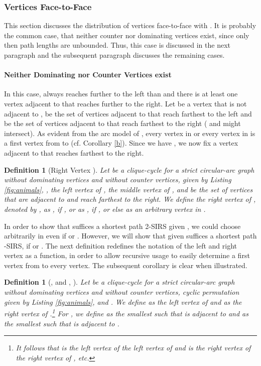 \documentclass[10pt]{article}
\newtheorem{definition}[theorem]{Definition}
\begin{document}
\subsubsection{Vertices Face-to-Face}\label{mvbislv}





This section discusses the distribution of vertices face-to-face with .
It is probably the common case, that neither counter nor dominating vertices exist,
since only then path lengths are unbounded.
Thus, this case is discussed in the next paragraph and the 
subsequent paragraph discusses the remaining cases.


\paragraph{Neither Dominating nor Counter Vertices exist}\label{beideLeer}
In this case,  always reaches further to the left than  and there is at least 
one vertex adjacent to  that reaches further to the right.
Let  be a vertex that is not adjacent to ,  be the set of vertices adjacent to  
that reach farthest to the left and  be the set of vertices adjacent to  that reach 
farthest to the right ( and  might intersect).
As evident from the arc model of , every vertex in  or every vertex in  
is a first vertex from  to  (cf. Corollary \ref{b}).
Since we have , we now fix a vertex adjacent to  that reaches farthest to the right.

\begin{definition}[Right Vertex ]\label{de_r_v}
Let  be a clique-cycle for a strict cir\-cu\-lar-arc graph  without 
dominating vertices and without counter vertices,  given by Listing \ref{fig:animals}, 
,  the left vertex of ,  the middle vertex of , and  be the 
set of vertices that are adjacent to  and reach farthest to the right.
We define the \emph{right vertex of }, denoted by ,  as , if , or 
as , if , or else as an arbitrary vertex in .
\end{definition}
In order to show that  suffices a shortest path 2-SIRS given , we could choose  arbitrarily in  even if  or .
However, we will show that  given  suffices a 
shortest path -SIRS, if  or .
The next definition redefines the notation of the left and right vertex as a 
function, in order to allow 
recursive usage to easily determine a first vertex from  to every vertex.
The subsequent corollary is clear when illustrated.

\begin{definition}[,   and , ]\label{lvi}
Let  be a clique-cycle for a strict circular-arc graph  without 
dominating vertices and without counter vertices, cyclic permutation 
 given by Listing \ref{fig:animals}, 
and . We define  as the left vertex of  and  as the right vertex 
of .\footnote{It follows that  is the left vertex of the left vertex of  and  
is the right vertex of the right vertex of , etc.}
For , we define  as the smallest  such that  is adjacent to  and  
 as the smallest  such that  is adjacent to .
\end{definition}
\end{document}
